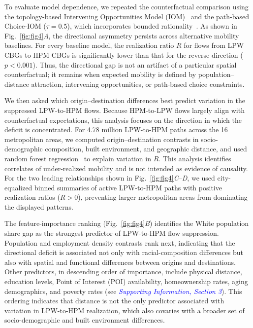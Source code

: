 \documentclass[9pt,twocolumn,twoside]{pnas-new}
\begin{document}
To evaluate model dependence, we repeated the counterfactual comparison using the topology-based Intervening Opportunities Model (IOM)~\cite{stouffer1940intervening} and the path-based Choice-IOM ($\tau=0.5$), which incorporates bounded rationality~\cite{lima2016understanding}. As shown in Fig.~\ref{fig:fig4}\textit{A}, the directional asymmetry persists across alternative mobility baselines. For every baseline model, the realization ratio $R$ for flows from LPW CBGs to HPM CBGs is significantly lower than that for the reverse direction ($p < 0.001$). Thus, the directional gap is not an artifact of a particular spatial counterfactual; it remains when expected mobility is defined by population--distance attraction, intervening opportunities, or path-based choice constraints.

We then asked which origin--destination differences best predict variation in the suppressed LPW-to-HPM flows. Because HPM-to-LPW flows largely align with counterfactual expectations, this analysis focuses on the direction in which the deficit is concentrated. For 4.78 million LPW-to-HPM paths across the 16 metropolitan areas, we computed origin--destination contrasts in socio-demographic composition, built environment, and geographic distance, and used random forest regression~\cite{breiman2001random, louppe2013understanding} to explain variation in $R$. This analysis identifies correlates of under-realized mobility and is not intended as evidence of causality. For the two leading relationships shown in Fig.~\ref{fig:fig4}\textit{C}--\textit{D}, we used city-equalized binned summaries of active LPW-to-HPM paths with positive realization ratios ($R>0$), preventing larger metropolitan areas from dominating the displayed patterns.

The feature-importance ranking (Fig.~\ref{fig:fig4}\textit{B}) identifies the White population share gap as the strongest predictor of LPW-to-HPM flow suppression. Population and employment density contrasts rank next, indicating that the directional deficit is associated not only with racial-composition differences but also with spatial and functional differences between origins and destinations. Other predictors, in descending order of importance, include physical distance, education levels, Point of Interest (POI) availability, homeownership rates, aging demographics, and poverty rates (see \textit{\textcolor{blue}{Supporting Information, Section 3}}). This ordering indicates that distance is not the only predictor associated with variation in LPW-to-HPM realization, which also covaries with a broader set of socio-demographic and built environment differences.
\end{document}
